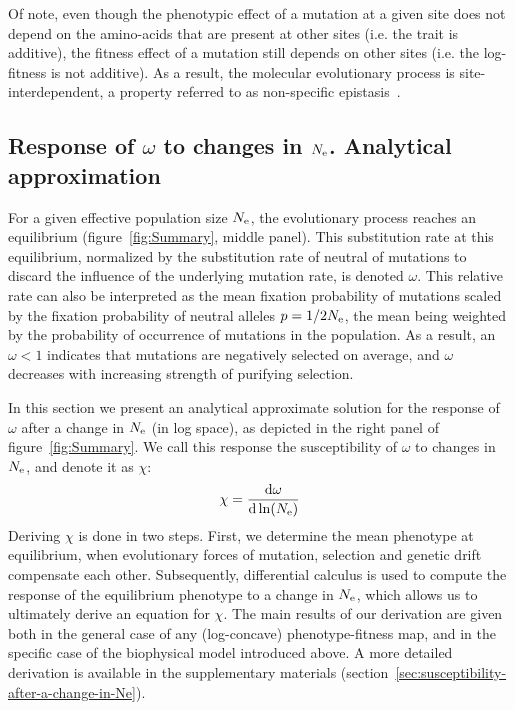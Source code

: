 Of note, even though the phenotypic effect of a mutation at a given site does not depend on the amino-acids that are present at other sites (i.e. the trait is additive), the fitness effect of a mutation still depends on other sites (i.e. the log-fitness is not additive).
As a result, the molecular evolutionary process is site-interdependent, a property referred to as non-specific epistasis~\citep{Dasmeh2018}.

\subsection{Response of \texorpdfstring{$\omega$}{ω} to changes in \texorpdfstring{$N_{\text{e}}$}{Nₑ}. Analytical approximation}

For a given effective population size $N_{\text{e}}$, the evolutionary process reaches an equilibrium (figure~\ref{fig:Summary}, middle panel).
This substitution rate at this equilibrium, normalized by the substitution rate of neutral of mutations to discard the influence of the underlying mutation rate, is denoted $\omega$.
This relative rate can also be interpreted as the mean fixation probability of mutations scaled by the fixation probability of neutral alleles $p = 1 / {2 N_{\text{e}}}$, the mean being weighted by the probability of occurrence of mutations in the population.
As a result, an $\omega < 1$ indicates that mutations are negatively selected on average, and $\omega$ decreases with increasing strength of purifying selection.

In this section we present an analytical approximate solution for the response of $\omega$ after a change in $N_{\text{e}}$ (in log space), as depicted in the right panel of figure~\ref{fig:Summary}.
We call this response the susceptibility of $\omega$ to changes in $N_{\text{e}}$, and denote it as $\chi$:
\begin{align}
    \chi = \frac{ \der \omega}{\der \ln (\Ne)} \label{eq:chi}
\end{align}
Deriving $\chi$ is done in two steps.
First, we determine the mean phenotype at equilibrium, when evolutionary forces of mutation, selection and genetic drift compensate each other.
Subsequently, differential calculus is used to compute the response of the equilibrium phenotype to a change in $N_{\text{e}}$, which allows us to ultimately derive an equation for $\chi$.
The main results of our derivation are given both in the general case of any (log-concave) phenotype-fitness map, and in the specific case of the biophysical model introduced above.
A more detailed derivation is available in the supplementary materials (section~\ref{sec:susceptibility-after-a-change-in-Ne}).

